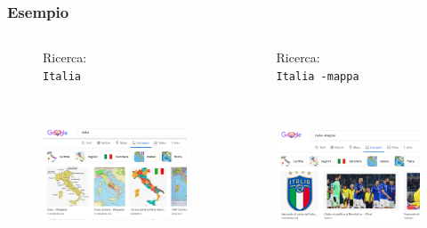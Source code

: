 \documentclass[]{beamer}
\begin{document}
\begin{frame}
\frametitle{Esempio}
\begin{columns}
\begin{column}{.5\textwidth}
  \begin{figure}
    Ricerca:\\\texttt{Italia}

    ~

    \includegraphics[width=\columnwidth]{img/italia.png}
  \end{figure}
\end{column}
\begin{column}{.5\textwidth}
  \begin{figure}
    Ricerca:\\\texttt{Italia -mappa}
    
    ~

    \includegraphics[width=\columnwidth]{img/italia2.png}
  \end{figure}
\end{column}
\end{columns}
\end{frame}
\end{document}
